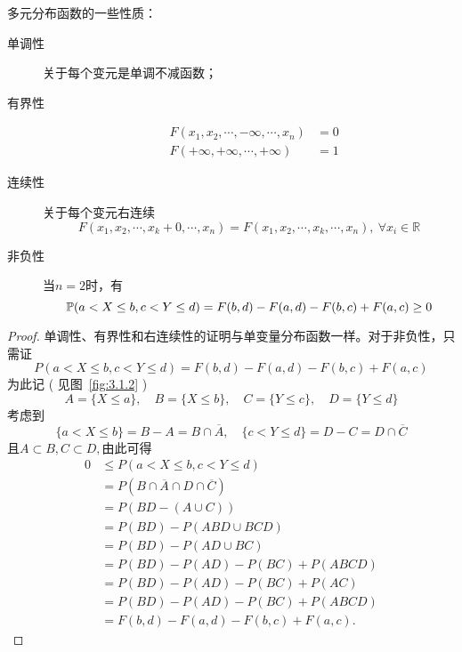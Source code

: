 \begin{property}多元分布函数的一些性质：
    \begin{description}
        \item[单调性] 关于每个变元是单调不减函数；
        \item[有界性] \begin{align*}
                 & F(x_1,x_2, \cdots, -\infty, \cdots, x_n) & =0 \\
                 & F(+\infty,+\infty, \cdots, +\infty)      & =1
            \end{align*}
        \item[连续性] 关于每个变元右连续
            \[ F(x_1,x_2, \cdots, x_k+0, \cdots, x_n) =F(x_1,x_2, \cdots, x_k, \cdots, x_n),\ \forall x_i \in \mathbb{R} \]
        \item[非负性] 当$n=2$时，有
            \begin{equation}\label{equ:2dim_Prob}
                \P(a<X \le b, c<Y \le d)= F(b, d)-F(a, d)-F(b, c)+ F(a, c) \ge 0
            \end{equation}
    \end{description}
\end{property}
\begin{proof}
    单调性、有界性和右连续性的证明与单变量分布函数一样。对于非负性，只需证
    \[ P(a<X \le b, c<Y \le d)=F(b, d)-F(a, d)-F(b, c)+F(a, c) \]
    为此记 ( 见图~\ref{fig:3.1.2} )
    \[ A=\{X \le a\}, \quad B=\{ X \le b \}, \quad C=\{Y \le c\}, \quad D=\{Y \le d\} \]
    考虑到
    \[ \{ a<X \le b \}=B-A=B \cap \overline{A}, \quad\{c<Y \le d\}=D-C=D \cap \overline{C} \]
    且$A \subset B, C\subset D,$由此可得
    \begin{align*}
        0 & \le P(a<X \le b, c<Y \le d)                      \\
          & =P(B \cap \overline{A} \cap D \cap \overline{C}) \\
          & =P(B D-(A \cup C))                               \\
          & =P(B D)-P(A B D \cup B C D)                      \\
          & =P(B D)-P(A D \cup B C)                          \\
          & =P(B D)-P(A D)-P(B C)+P(A B C D)                 \\
          & =P(B D)-P(A D)-P(B C)+P(A C )                    \\
          & =P(B D)-P(A D)-P(B C)+P(A B C D)                 \\
          & =F(b, d)-F(a, d)-F(b, c)+F(a, c).
    \end{align*}
\end{proof}

